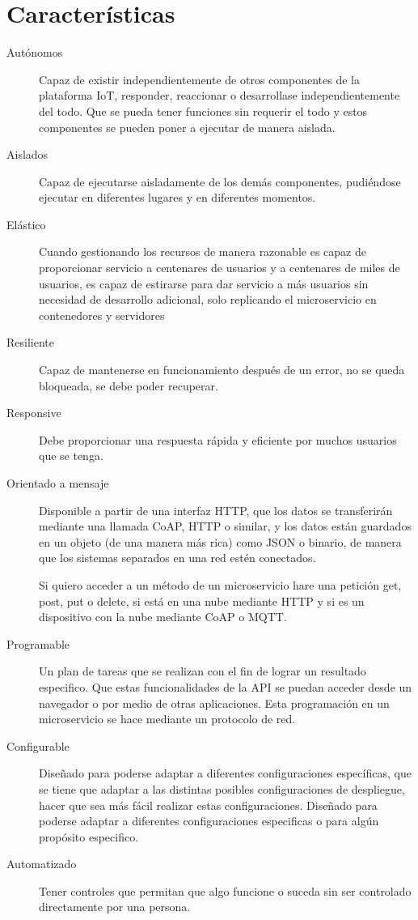 \documentclass[12pt]{report} %
\begin{document}
\section{Características}
	\begin{description}
		\item[Autónomos] Capaz de existir independientemente de otros componentes de la plataforma IoT, responder, reaccionar o desarrollase independientemente del todo. Que se pueda tener funciones sin requerir el todo y estos componentes se pueden poner a ejecutar de manera aislada.
		\item[Aislados] Capaz de ejecutarse aisladamente de los demás componentes, pudiéndose ejecutar en diferentes lugares y en diferentes momentos.
		\item[Elástico] Cuando gestionando los recursos de manera razonable es capaz de proporcionar servicio a centenares de usuarios y a centenares de miles de usuarios, es capaz de estirarse para dar servicio a más usuarios sin necesidad de desarrollo adicional, solo replicando el microservicio en contenedores y servidores
		\item[Resiliente] Capaz de mantenerse en funcionamiento después de un error, no se queda bloqueada, se debe poder recuperar.
		\item[Responsive] Debe proporcionar una respuesta rápida y eficiente por muchos usuarios que se tenga.
		\item[Orientado a mensaje] Disponible a partir de una interfaz HTTP, que los datos se transferirán mediante una llamada CoAP, HTTP o similar, y los datos están guardados en un objeto (de una manera más rica) como JSON o binario, de manera que los sistemas separados en una red estén conectados.
		
		Si quiero acceder a un método de un microservicio hare una petición get, post, put o delete, si está en una nube mediante HTTP y si es un dispositivo con la nube mediante CoAP o MQTT.

		\item[Programable] Un plan de tareas que se realizan con el fin de lograr un resultado especifico. Que estas funcionalidades de la API se puedan acceder desde un navegador o por medio de otras aplicaciones. Esta programación en un microservicio se hace mediante un protocolo de red.
		\item[Configurable] Diseñado para poderse adaptar a diferentes configuraciones específicas, que se tiene que adaptar a las distintas posibles configuraciones de despliegue, hacer que sea más fácil realizar estas configuraciones. Diseñado para poderse adaptar a diferentes configuraciones especificas o para algún propósito especifico.
		\item[Automatizado] Tener controles que permitan que algo funcione o suceda sin ser controlado directamente por una persona.
	\end{description}
\end{document}
